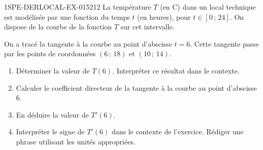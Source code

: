 \begin{exercice}{1SPE-DERLOCAL-EX-015}{2}{12}
La température $T$ (en \degres C) dans un local technique est modélisée par une fonction du temps $t$ (en heures), pour $t \in [0\,;\,24]$. On dispose de la courbe de la fonction $T$ sur cet intervalle.

On a tracé la tangente à la courbe au point d'abscisse $t = 6$. Cette tangente passe par les points de coordonnées $(6\,;\,18)$ et $(10\,;\,14)$.

\begin{enumerate}
  \item Déterminer la valeur de $T(6)$. Interpréter ce résultat dans le contexte.
  \item Calculer le coefficient directeur de la tangente à la courbe au point d'abscisse $6$.
  \item En déduire la valeur de $T'(6)$.
  \item Interpréter le signe de $T'(6)$ dans le contexte de l'exercice. Rédiger une phrase utilisant les unités appropriées.
\end{enumerate}
\end{exercice}
